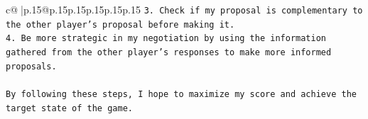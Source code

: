 \documentclass{article}
\begin{document}
{\begin{supertabular}{c@{$\;$}|p{.15\linewidth}@{}p{.15\linewidth}p{.15\linewidth}p{.15\linewidth}p{.15\linewidth}p{.15\linewidth}}
{{{\texttt{3. Check if my proposal is complementary to the other player's proposal before making it.} \\
\texttt{4. Be more strategic in my negotiation by using the information gathered from the other player's responses to make more informed proposals.} \\
\\ 
\texttt{By following these steps, I hope to maximize my score and achieve the target state of the game.} \\
            }
        }
    }
     \\ \\

\end{supertabular}
}
\end{document}
